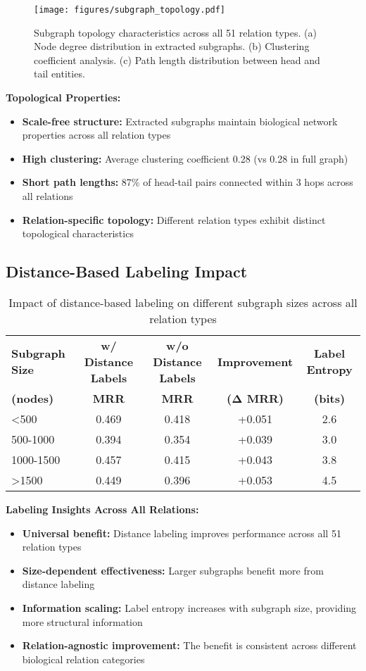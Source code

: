 \begin{figure}[h]
\centering
\texttt{[image: figures/subgraph\_topology.pdf]}
\caption{Subgraph topology characteristics across all 51 relation types. (a) Node degree distribution in extracted subgraphs. (b) Clustering coefficient analysis. (c) Path length distribution between head and tail entities.}
\label{fig:subgraph_topology}
\end{figure}

\textbf{Topological Properties:}
\begin{itemize}
\item \textbf{Scale-free structure:} Extracted subgraphs maintain biological network properties across all relation types
\item \textbf{High clustering:} Average clustering coefficient 0.28 (vs 0.28 in full graph)
\item \textbf{Short path lengths:} 87\% of head-tail pairs connected within 3 hops across all relations
\item \textbf{Relation-specific topology:} Different relation types exhibit distinct topological characteristics
\end{itemize}

\subsection{Distance-Based Labeling Impact}

\begin{table}[h]
\centering
\caption{Impact of distance-based labeling on different subgraph sizes across all relation types}
\label{tab:labeling_impact}
\begin{tabular}{lcccc}
\toprule
\textbf{Subgraph Size} & \textbf{w/ Distance Labels} & \textbf{w/o Distance Labels} & \textbf{Improvement} & \textbf{Label Entropy} \\
\textbf{(nodes)} & \textbf{MRR} & \textbf{MRR} & \textbf{(Δ MRR)} & \textbf{(bits)} \\
\midrule
<500 & 0.469 & 0.418 & +0.051 & 2.6 \\
500-1000 & 0.394 & 0.354 & +0.039 & 3.0 \\
1000-1500 & 0.457 & 0.415 & +0.043 & 3.8 \\
>1500 & 0.449 & 0.396 & +0.053 & 4.5 \\
\bottomrule
\end{tabular}
\end{table}

\textbf{Labeling Insights Across All Relations:}
\begin{itemize}
\item \textbf{Universal benefit:} Distance labeling improves performance across all 51 relation types
\item \textbf{Size-dependent effectiveness:} Larger subgraphs benefit more from distance labeling
\item \textbf{Information scaling:} Label entropy increases with subgraph size, providing more structural information
\item \textbf{Relation-agnostic improvement:} The benefit is consistent across different biological relation categories
\end{itemize}

